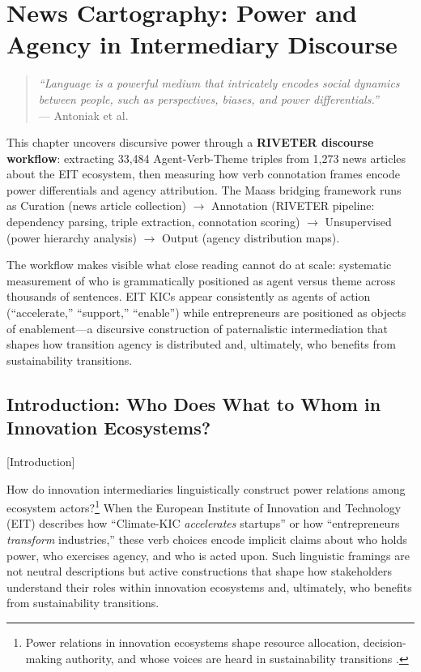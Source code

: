 \documentclass[../main.tex]{subfiles}
\begin{document}
\chapter{News Cartography: Power and Agency in Intermediary Discourse}
\margintoc

\begin{quote}
\textit{``Language is a powerful medium that intricately encodes social dynamics between people, such as perspectives, biases, and power differentials.''}\\
--- Antoniak et al. \cite{antoniak2023riveter}
\end{quote}

\begin{chapteroverview}
This chapter uncovers discursive power through a \textbf{RIVETER discourse workflow}: extracting 33,484 Agent-Verb-Theme triples from 1,273 news articles about the EIT ecosystem, then measuring how verb connotation frames encode power differentials and agency attribution. The Maass bridging framework runs as Curation (news article collection) $\rightarrow$ Annotation (RIVETER pipeline: dependency parsing, triple extraction, connotation scoring) $\rightarrow$ Unsupervised (power hierarchy analysis) $\rightarrow$ Output (agency distribution maps).

The workflow makes visible what close reading cannot do at scale: systematic measurement of who is grammatically positioned as agent versus theme across thousands of sentences. EIT KICs appear consistently as agents of action (``accelerate,'' ``support,'' ``enable'') while entrepreneurs are positioned as objects of enablement---a discursive construction of paternalistic intermediation that shapes how transition agency is distributed and, ultimately, who benefits from sustainability transitions.
\end{chapteroverview}

\section{Introduction: Who Does What to Whom in Innovation Ecosystems?}[Introduction]

How do innovation intermediaries linguistically construct power relations among ecosystem actors?\footnote{Power relations in innovation ecosystems shape resource allocation, decision-making authority, and whose voices are heard in sustainability transitions \cite{avelino2017power}.} When the European Institute of Innovation and Technology (EIT) describes how ``Climate-KIC \textit{accelerates} startups'' or how ``entrepreneurs \textit{transform} industries,'' these verb choices encode implicit claims about who holds power, who exercises agency, and who is acted upon. Such linguistic framings are not neutral descriptions but active constructions that shape how stakeholders understand their roles within innovation ecosystems and, ultimately, who benefits from sustainability transitions.
\end{document}
